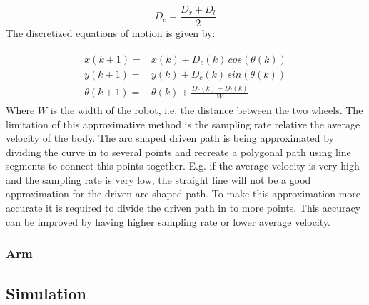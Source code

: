 \begin{equation}
    D_c = \frac{D_r + D_l}{2}
\end{equation}
The discretized equations of motion is given by:

\begin{eqnarray}
\begin{aligned}
    x(k+1) =& x(k) + D_c(k)\,cos(\theta(k))\\
    y(k+1) =& y(k) + D_c(k)\,sin(\theta(k))\\
    \theta(k+1) =& \theta(k) + \frac{D_r(k)-D_l(k)}{W}
\end{aligned}
\end{eqnarray}\label{eq:Disc_EOM}
Where $W$ is the width of the robot, i.e. the distance between the two wheels.
The limitation of this approximative method is the sampling rate relative the average velocity of the body.
The arc shaped driven path is being approximated by dividing the curve in to several points and recreate a polygonal path using line segments to connect this points together. 
E.g. if the average velocity is very high and the sampling rate is very low, the straight line will not be a good approximation for the driven arc shaped path.
To make this approximation more accurate it is required to divide the driven path in to more points.
This accuracy can be improved by having higher sampling rate or lower average velocity.

\subsubsection{Arm}

\subsection{Simulation}
